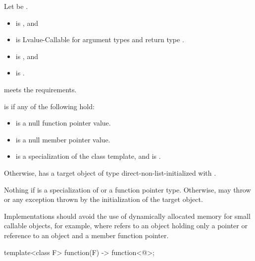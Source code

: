 \begin{itemdescr}
\pnum
Let  be .

\pnum
\constraints
\begin{itemize}
\item
{} is , and
\item
{} is Lvalue-Callable for argument types
 and return type .
\end{itemize}

\pnum
\mandates
\begin{itemize}
\item
{} is , and
\item
{} is .
\end{itemize}

\pnum
\expects
{} meets the  requirements.

\pnum
\ensures
{} is  if any of the following hold:
\begin{itemize}
\item {} is a null function pointer value.
\item {} is a null member pointer value.
\item {} is
a specialization of the  class template, and
 is .
\end{itemize}

\pnum
Otherwise,  has a target object of type 
direct-non-list-initialized with .

\pnum
\throws
Nothing if  is
a specialization of  or
a function pointer type.
Otherwise, may throw  or
any exception thrown by the initialization of the target object.

\pnum
\recommended
Implementations should avoid the use of
dynamically allocated memory for small callable objects, for example,
where  refers to an object holding only a pointer or
reference to an object and a member function pointer.
\end{itemdescr}


\begin{itemdecl}
template<class F> function(F) -> function<@\seebelow@>;
\end{itemdecl}


